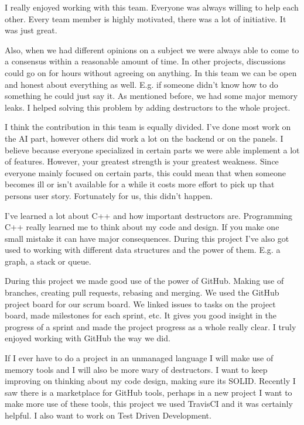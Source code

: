 I really enjoyed working with this team. Everyone was always willing to help each other. Every team member is highly motivated, there was a lot of initiative. It was just great.

Also, when we had different opinions on a subject we were always able to come to a consensus within a reasonable amount of time. In other projects, discussions could go on for hours without agreeing on anything. In this team we can be open and honest about everything as well. E.g. if someone didn’t know how to do something he could just say it. 
As mentioned before, we had some major memory leaks. I helped solving this problem by adding destructors to the whole project.

I think the contribution in this team is equally divided. I’ve done most work on the AI part, however others did work a lot on the backend or on the panels. I believe because everyone specialized in certain parts we were able implement a lot of features. However, your greatest strength is your greatest weakness. Since everyone mainly focused on certain parts, this could mean that when someone becomes ill or isn’t available for a while it costs more effort to pick up that persons user story. Fortunately for us, this didn’t happen.

I’ve learned a lot about C++ and how important destructors are. Programming C++ really learned me to think about my code and design. If you make one small mistake it can have major consequences. During this project I’ve also got used to working with different data structures and the power of them. E.g. a graph, a stack or queue.

During this project we made good use of the power of GitHub. Making use of branches, creating pull requests, rebasing and merging. We used the GitHub project board for our scrum board. We linked issues to tasks on the project board, made milestones for each sprint, etc. It gives you good insight in the progress of a sprint and made the project progress as a whole really clear. I truly enjoyed working with GitHub the way we did.

If I ever have to do a project in an unmanaged language I will make use of memory tools and I will also be more wary of destructors. I want to keep improving on thinking about my code design, making sure its SOLID. Recently I saw there is a marketplace for GitHub tools, perhaps in a new project I want to make more use of these tools, this project we used TravisCI and it was certainly helpful. I also want to work on Test Driven Development.



